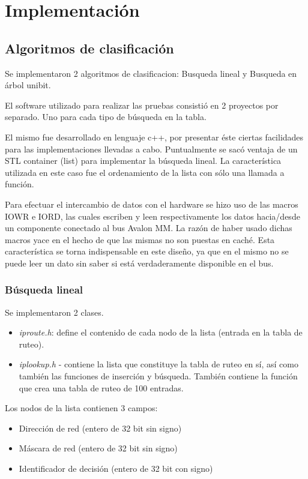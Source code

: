 \chapter{Implementación}

\section{Algoritmos de clasificación}

Se implementaron 2 algoritmos de clasificacion: Busqueda lineal y Busqueda en árbol unibit.

El software utilizado para realizar las pruebas consistió en 2 proyectos por separado. Uno para cada tipo de búsqueda en la tabla.

El mismo fue desarrollado en lenguaje c++, por presentar éste ciertas facilidades para las implementaciones llevadas a cabo. Puntualmente se sacó ventaja de un STL container (list) para implementar la búsqueda lineal. La característica utilizada en este caso fue el ordenamiento de la lista con sólo una llamada a función.

Para efectuar el intercambio de datos con el hardware se hizo uso de las macros IOWR e IORD, las cuales escriben y leen respectivamente los datos hacia/desde un componente conectado al bus Avalon MM. La razón de haber usado dichas macros yace en el hecho de que las mismas no son puestas en caché. Esta característica se torna indispensable en este diseño, ya que en el mismo no se puede leer un dato sin saber si está verdaderamente disponible en el bus.


\subsection {Búsqueda lineal}

Se implementaron 2 clases. 

\begin{itemize}
	\item \textit{iproute.h}: define el contenido de cada nodo de la lista (entrada en la tabla de ruteo).
	\item \textit{iplookup.h} -  contiene la lista que constituye la tabla de ruteo en sí, así como también las funciones de inserción y búsqueda. También contiene la función que crea una tabla de ruteo de 100 entradas.
\end{itemize}

Los nodos de la lista contienen 3 campos:

\begin{itemize}
	\item Dirección de red (entero de 32 bit sin signo)
	\item Máscara de red (entero de 32 bit sin signo)
	\item Identificador de decisión (entero de 32 bit con signo)
\end{itemize}

